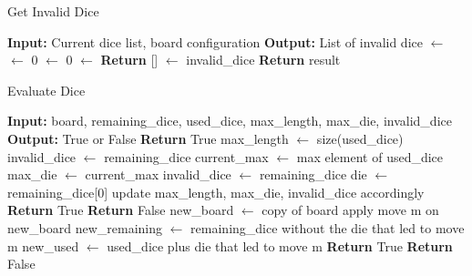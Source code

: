 \begin{algorithm}
    \label{fig:invalid-dice-pseudocode}
    \caption{Get Invalid Dice}
    \begin{algorithmic}
    \State \textbf{Input:} Current dice list, board configuration
    \State \textbf{Output:} List of invalid dice
    \State {} $\gets$ 
    \State {} $\gets$ 0
    \State {} $\gets$ 0
    \State {} $\gets$ 
    \State
        \State \textbf{Return} [] 
    \Else {}
        \State {} $\gets$ invalid\_dice
            \State {}
        \EndFor
        \State \textbf{Return} result
    \EndIf
    \end{algorithmic}
\end{algorithm}

\begin{algorithm}
    \caption{Evaluate Dice}
    \begin{algorithmic}
    \State \textbf{Input:} board, remaining\_dice, used\_dice, max\_length, max\_die, invalid\_dice
    \State \textbf{Output:} True or False
    \State
     
        \State \textbf{Return} True
    \EndIf
    \State
     
        \State max\_length $\gets$ size(used\_dice)
        \State invalid\_dice $\gets$ remaining\_dice
        \State current\_max $\gets$ max element of used\_dice
            \State max\_die $\gets$ current\_max
            \State invalid\_dice $\gets$ remaining\_dice
        \EndIf
    \EndIf
    \State
     
        \State die $\gets$ remaining\_dice[0]
                \State update max\_length, max\_die, invalid\_dice accordingly
                \State \textbf{Return} True
            \EndIf
        \EndFor
        \State \textbf{Return} False 
    \EndIf
    \State
        \State new\_board $\gets$ copy of board
        \State apply move m on new\_board
        \State new\_remaining $\gets$ remaining\_dice without the die that led to move m
        \State new\_used $\gets$ used\_dice plus die that led to move m
            \State \textbf{Return} True
        \EndIf
    \EndFor
    \State \textbf{Return} False
    \end{algorithmic}
\end{algorithm}


